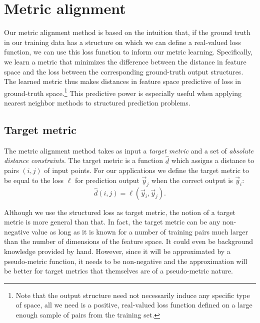 \chapter{Metric alignment}

Our metric alignment method is based on the intuition that, if the ground truth in our training data has a structure on which we can define a real-valued loss function, we can use this loss function to inform our metric learning.
Specifically, we learn a metric that minimizes the difference between the distance in feature space and the loss between the corresponding ground-truth output structures.
The learned metric thus makes distances in feature space predictive of loss in ground-truth space.\footnote{Note that the output structure need not necessarily induce any specific type of space, all we need is a positive, real-valued loss function defined on a large enough sample of pairs from the training set.}
This predictive power is especially useful when applying nearest neighbor methods to structured prediction problems.



\section{Target metric}

The metric alignment method takes as input a \emph{target metric} and a set of \emph{absolute distance constraints}.
The target metric is a function $\hat{d}$ which assigns a distance to pairs $(i,j)$ of input points.
For our applications we define the target metric to be equal to the loss $\ell$ for prediction output $\vec{y}_j$ when the correct output is $\vec{y}_i$:
\begin{equation}
\hat{d}(i,j) = \ell(\vec{y}_i, \vec{y}_j).
\end{equation}

Although we use the structured loss as target metric, the notion of a target metric is more general than that.
In fact, the target metric can be any non-negative value as long as it is known for a number of training pairs much larger than the number of dimensions of the feature space.
It could even be background knowledge provided by hand.
However, since it will be approximated by a pseudo-metric function, it needs to be non-negative and the approximation will be better for target metrics that themselves are of a pseudo-metric nature.

